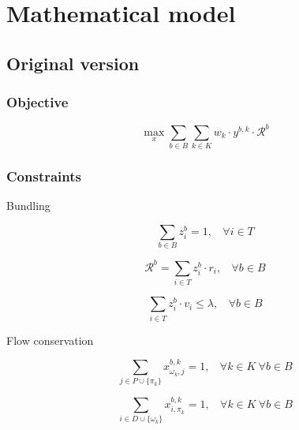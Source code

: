 \documentclass[12pt ]{article}
\begin{document}
\setcounter{secnumdepth}{0} %

\section{Mathematical model}

\subsection{Original version}
\subsubsection{Objective}

\begin{equation}
	\max_x \sum_{ b \in B} \sum_{k \in K} w_k \cdot y^{b,k} \cdot \mathcal{R}^b
	\label{eq:maxExpectedReward}	
\end{equation}
\vspace{0.5cm}

\subsubsection{Constraints}


Bundling

\begin{equation}
	\sum_{ b \in B} z_{i}^{b} = 1,~~~~\forall i \in T
	\label{eq:taskMembership}
\end{equation}

\begin{equation}
	\mathcal{R}^b = \sum_{ i \in T} z_{i}^{b} \cdot r_i,~~~~\forall b \in B
	\label{eq:bundleReward}
\end{equation}

\begin{equation}
	\sum_{ i \in T} z_{i}^{b} \cdot v_i \le \lambda,~~~~\forall b \in B
	\label{eq:volThreshold}
\end{equation}


Flow conservation

\begin{equation}
	\sum_{ j \in P \cup \{ \pi_k \} } x_{\omega_k, j}^{b, k} = 1,~~~~\forall k \in K ~\forall b \in B	
	\label{eq:flowBegin}
\end{equation}

\begin{equation}
	\sum_{ i \in D \cup \{\omega_k\} } x_{i,\pi_k}^{b,k} = 1,~~~~\forall k \in K ~\forall b \in B	
	\label{eq:flowEnd}
\end{equation}
\end{document}
